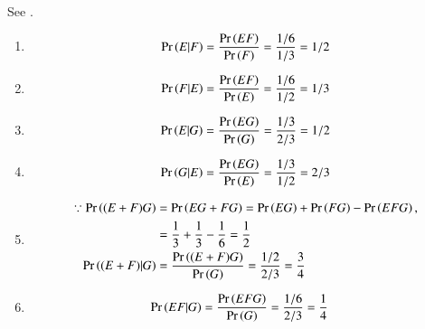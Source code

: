 		\begin{table}[htb]
		\centering
		
		\caption{}
		\label{tab:ncert/12/13/1/11/table1}
		\end{table}
	See 	
		.
		\begin{enumerate}
		\item
		\begin{align}
			\Pr\left(E\middle|F\right) = \frac{\Pr\left(EF\right)}{\Pr\left(F\right)}
		 = \frac{1/6}{1/3}
		 = 1/2
		\end{align}
		\item
		\begin{align}
		\Pr\left(F|E\right) = \frac{\Pr\left(EF\right)}{\Pr\left(E\right)}
         = \frac{1/6}{1/2}
         = 1/3
        \end{align}
		\item
		\begin{align}
			\Pr\left(E|G\right) = \frac{\Pr\left(EG\right)}{\Pr\left(G\right)}
        = \frac{1/3}{2/3}
        = 1/2
        \end{align}
        \item
        \begin{align}
		\Pr\left(G|E\right) = \frac{\Pr\left(EG\right)}{\Pr\left(E\right)}
        = \frac{1/3}{1/2}
        = 2/3
        \end{align}
        \item
        \begin{align}
		\because	\Pr\left((E+F)G\right) &= \Pr\left(EG+FG\right)= \Pr\left(EG\right)+\Pr\left(FG\right)-\Pr\left(EFG\right),
	\nonumber	\\
		 &= \frac{1}{3} + \frac{1}{3} - \frac{1}{6}
		 = \frac{1}{2}
		 \\
		\Pr\left((E+F)|G\right) &= \frac{\Pr\left((E+F)G\right)}{\Pr\left(G\right)}
		 = \frac{1/2}{2/3}
		 = \frac{3}{4}
		\end{align}
		\item
		\begin{align}
			\Pr\left(EF|G\right) &= \frac{\Pr\left(EFG\right)}{\Pr\left(G\right)}
         = \frac{1/6}{2/3}
			= \frac{1}{4}
		\end{align}

\end{enumerate}
